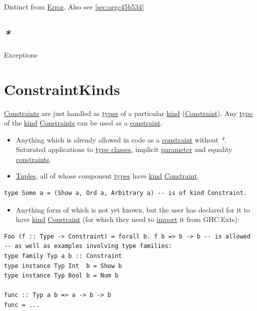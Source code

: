 \documentclass[a4paper,14pt,oneside]{book}
\begin{document}
Distinct from \hyperref[orgb40eb26]{Error}. Also see \ref{sec:orgc45b534}

\section{\emph{*}}
\label{sec:orgf58eef9}

\label{org8ad5ef7}Exceptions

\chapter{\label{orgab5db26}ConstraintKinds}
\label{sec:orga3600f3}
\hyperref[orga03e8eb]{Constraints} are just handled as \hyperref[orgb570156]{types} of a particular \hyperref[orga9c0b8b]{kind} (\hyperref[orgda255de]{Constraint}).
Any \hyperref[org3b8f313]{type} of the \hyperref[orga9c0b8b]{kind} \hyperref[orga03e8eb]{Constraints} can be used as a \hyperref[orgda255de]{constraint}.
\begin{itemize}
\item Anything which is already allowed in code as a \hyperref[orgda255de]{constraint} without \emph{*}. Saturated applications to \hyperref[orgb677d28]{type classes}, implicit \hyperref[org5062af7]{parameter} and equality \hyperref[orga03e8eb]{constraints}.
\item \hyperref[orga499375]{Tuples}, all of whose component \hyperref[orgb570156]{types} have \hyperref[orga9c0b8b]{kind} \hyperref[orgda255de]{Constraint}.
\end{itemize}
\begin{verbatim}
type Some a = (Show a, Ord a, Arbitrary a) -- is of kind Constraint.
\end{verbatim}
\begin{itemize}
\item Anything form of which is not yet known, but the user has declared for it to have \hyperref[orga9c0b8b]{kind} \hyperref[orgda255de]{Constraint} (for which they need to \hyperref[orgb6d7dfb]{import} it from GHC.Exts):
\end{itemize}
\begin{verbatim}
Foo (f :: Type -> Constraint) = forall b. f b => b -> b -- is allowed
-- as well as examples involving type families:
type family Typ a b :: Constraint
type instance Typ Int  b = Show b
type instance Typ Bool b = Num b

func :: Typ a b => a -> b -> b
func = ...
\end{verbatim}
\end{document}
